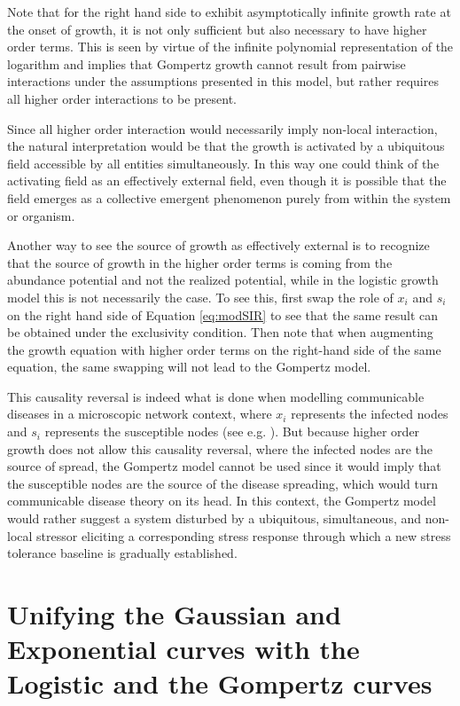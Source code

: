 \documentclass{article}
\begin{document}
Note that for the right hand side to exhibit asymptotically infinite growth rate at the onset of growth, it is not only sufficient but also necessary to have higher order terms. This is seen by virtue of the infinite polynomial representation of the logarithm and implies that Gompertz growth cannot result from pairwise interactions under the assumptions presented in this model, but rather requires all higher order interactions to be present.

Since all higher order interaction would necessarily imply non-local interaction, the natural interpretation would be that the growth is activated by a ubiquitous field accessible by all entities simultaneously. 
In this way one could think of the activating field as an effectively external field, even though it is possible that the field emerges as a collective emergent phenomenon purely from within the system or organism.

Another way to see the source of growth as effectively external is to recognize that the source of growth in the higher order terms is coming from the abundance potential and not the realized potential, while in the logistic growth model this is not necessarily the case. 
To see this, first swap the role of $x_i$ and $s_i$ on the right hand side of Equation \ref{eq:modSIR} to see that the same result can be obtained under the exclusivity condition. 
Then note that when augmenting the growth equation with higher order terms on the right-hand side of the same equation, the same swapping will not lead to the Gompertz model. 

This causality reversal is indeed what is done when modelling communicable diseases in a microscopic network context, where $x_i$ represents the infected nodes and $s_i$ represents the susceptible nodes (see e.g. \citet{estrada2022networked}). But because higher order growth does not allow this causality reversal, where the infected nodes are the source of spread, the Gompertz model cannot be used since it would imply that the susceptible nodes are the source of the disease spreading, which would turn communicable disease theory on its head. In this context, the Gompertz model would rather suggest a system disturbed by a ubiquitous, simultaneous, and non-local stressor eliciting a corresponding stress response through which a new stress tolerance baseline is gradually established.

\section{Unifying the Gaussian and Exponential curves with the Logistic and the Gompertz curves}
\end{document}
